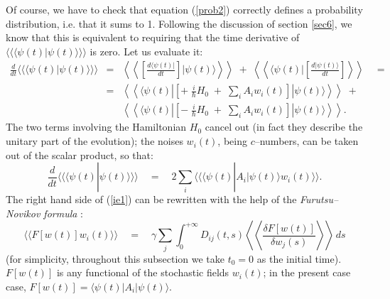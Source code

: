 \documentclass[10pt,a4paper]{article}
\newcommand{\llangle}{\langle\!\langle}
\newcommand{\rrangle}{\rangle\!\rangle}
\newcommand{\LLangle}{\left\langle\!\!\!\left\langle}
\newcommand{\RRangle}{\right\rangle\!\!\!\right\rangle}
\begin{document}
Of course, we have to check that equation (\ref{prob2}) correctly
defines a probability distribution, i.e. that it sums to 1.
Following the discussion of section \ref{sec6}, we know that this
is equivalent to requiring that the time derivative of $\llangle
\langle\psi(t)|\psi(t)\rangle \rrangle$ is zero. Let us evaluate
it:
\begin{eqnarray*}
\frac{d}{dt}\llangle\langle\psi(t)|\psi(t)\rangle\rrangle & = &
\LLangle\left[\frac{d\langle\psi(t)|}{dt}\right]|\psi(t)
\rangle\RRangle\; + \;
\LLangle\langle\psi(t)|\left[\frac{d|\psi(t)\rangle}{dt}\right]
\RRangle\quad = \\
& = & \LLangle\langle\psi(t)|\left[ +\;\frac{i}{\hbar} H_{0}\; +
\;\sum_{i}
A_{i}w_{i}(t)\right]|\psi(t)\rangle\RRangle \; + \\
& &  \LLangle\langle\psi(t)|\left[ -\;\frac{i}{\hbar}H_{0} \; +
\;\sum_{i} A_{i}w_{i}(t)\right]|\psi(t)\rangle\RRangle.
\end{eqnarray*}
The two terms involving the Hamiltonian $H_{0}$ cancel out (in
fact they describe the unitary part of the evolution); the noises
$w_{i}(t)$, being $c$--numbers, can be taken out of the scalar
product, so that:
\begin{equation} \label{ie1}
\frac{d}{dt}\llangle\langle\psi(t)|\psi(t)\rangle\rrangle \quad =
\quad 2 \sum_{i} \llangle\langle\psi(t)|A_{i}|\psi(t)\rangle
w_{i}(t)\rrangle.
\end{equation}
The right hand side of (\ref{ie1}) can be rewritten with the help
of the {\it Furutsu--Novikov formula} \cite{ksv, gi2}:
\begin{equation} \label{fn}
\llangle F[w(t)]w_{i}(t) \rrangle \quad = \quad \gamma \sum_{j}
\int_{0}^{+\infty} D_{ij}(t,s) \LLangle \frac{\delta
F[w(t)]}{\delta w_{j}(s)} \RRangle\, ds
\end{equation}
(for simplicity, throughout this subsection we take $t_{0} = 0$ as
the initial time). $F[w(t)]$ is any functional of the stochastic
fields $w_{i}(t)$; in the present case case, $F[w(t)] =
\langle\psi(t)|A_{i}|\psi(t)\rangle$.
\end{document}
